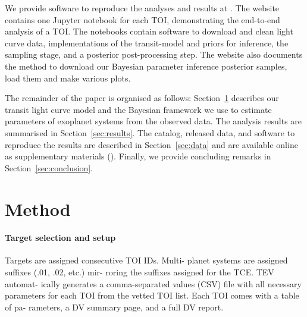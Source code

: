 \documentclass[floatfix,ApJL,twocolumn]{aastex631}
\begin{document}
We provide software to reproduce the analyses and results at \atlasUrl.
The website contains one Jupyter notebook for each TOI, demonstrating the end-to-end analysis of a TOI.
The notebooks contain software to download and clean light curve data, implementations of the transit-model and priors for inference, the \pymc sampling stage, and a posterior post-processing step.
The website also documents the method to download our Bayesian parameter inference posterior samples, load them and make various plots.


The remainder of the paper is organised as follows: Section~\ref{sec:method} describes our transit light curve model and the Bayesian framework we use to estimate parameters of exoplanet systems from the observed data.
The analysis results are summarised in Section~\ref{sec:results}.
The catalog, released data, and software to reproduce the results are described in Section~\ref{sec:data} and are available online as supplementary materials (\atlasUrl).
Finally, we provide concluding remarks in Section~\ref{sec:conclusion}.

\section{Method} \label{sec:method}











\paragraph{Target selection and setup }



Targets are assigned consecutive TOI IDs. Multi- planet systems are assigned suffixes (.01, .02, etc.) mir- roring the suffixes assigned for the TCE. TEV automat- ically generates a comma-separated values (CSV) file with all necessary parameters for each TOI from the vetted TOI list. Each TOI comes with a table of pa- rameters, a DV summary page, and a full DV report.
\end{document}
